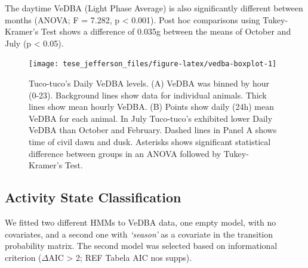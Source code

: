 \documentclass[english,msc,numbers,hidelinks]{coppe}
\begin{document}
  The daytime VeDBA (Light Phase Average) is also significantly different between months (ANOVA; F = 7.282, p \textless{} 0.001). Post hoc comparisons using Tukey-Kramer's Test shows a difference of 0.035g between the means of October and July (p \textless{} 0.05). \newline
  \begin{figure}[H]

  {\centering \texttt{[image: tese\_jefferson\_files/figure-latex/vedba-boxplot-1]} 

  }

  \caption{Tuco-tuco's Daily VeDBA levels. (A) VeDBA was binned by hour (0-23). Background lines show data for individual animals. Thick lines show mean hourly VeDBA. (B) Points show daily (24h) mean VeDBA for each animal. In July Tuco-tuco's exhibited lower Daily VeDBA than October and February. Dashed lines in Panel A shows time of civil dawn and dusk. Asterisks shows significant statistical difference between groups in an ANOVA followed by Tukey-Kramer's Test.}\label{fig:vedba-boxplot}
  \end{figure}
  \hypertarget{activity-state-classification}{%
  \subsection{Activity State Classification}\label{activity-state-classification}}

  We fitted two different HMMs to VeDBA data, one empty model, with no covariates, and a second one with \emph{`season'} as a covariate in the transition probability matrix. The second model was selected based on informational criterion (\(\Delta\)AIC \textgreater{} 2; REF Tabela AIC nos supps).
\end{document}
